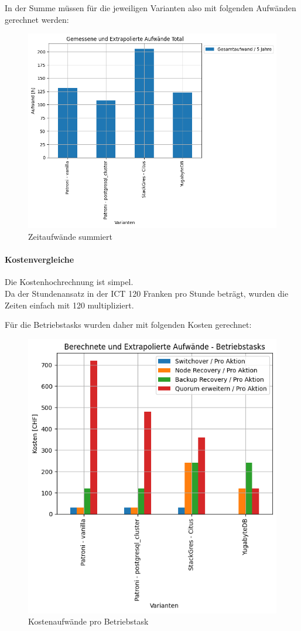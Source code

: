 \clearpage
\begin{flushleft}
    In der Summe müssen für die jeweiligen Varianten also mit folgenden Aufwänden gerechnet werden:
    \begin{figure}[H]
        \centering
        \includegraphics[width=0.65\linewidth]{source/pandas_data_chart_plotter/time_investment_summe}
        \caption{Zeitaufwände summiert}
        \label{fig:time_investment_summe}
    \end{figure}
    \paragraph{Kostenvergleiche}
    Die Kostenhochrechnung ist simpel.\\
    Da der Stundenansatz in der ICT 120 Franken pro Stunde beträgt, wurden die Zeiten einfach mit 120 multipliziert.
\end{flushleft}
\begin{flushleft}
    Für die Betriebstasks wurden daher mit folgenden Kosten gerechnet:
    \begin{figure}[H]
        \centering
        \includegraphics[width=0.65\linewidth]{source/pandas_data_chart_plotter/cost_investment_action}
        \caption{Kostenaufwände pro Betriebstask}
        \label{fig:cost_investment_action}
    \end{figure}
\end{flushleft}
